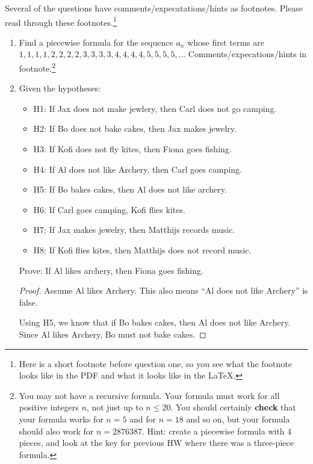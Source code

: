 \documentclass{article}
\begin{document}
\noindent Several of the questions have comments/expecatations/hints as footnotes. Please read through these footnotes.\footnote{Here is a short footnote before question one, so you see what the footnote looks like in the PDF and what it looks like in the LaTeX.}
\begin{enumerate}

\item Find a piecewise formula for the sequence $a_n$ whose first terms are\vskip1pt $1,1,1,1,2,2,2,2,3,3,3,3,4,4,4,4,5,5,5,5,\dots$\vskip1pt  Comments/expecations/hints in footnote.\footnote{You may not have a recursive formula. Your formula must work for all positive integers $n$, not just up to $n \leq 20$. You should certainly {\bf check} that your formula works for $n=5$ and for $n=18$ and so on, but your formula should also work for $n=2876387$. Hint: create a piecewise formula with $4$ pieces, and look at the key for previous HW where there was a three-piece formula.}

\newpage

\item Given the hypotheses:
\begin{itemize}
\item H1: If Jax does not make jewlery, then Carl does not go camping. 
\item H2: If Bo does not bake cakes, then Jax makes jewelry. 
\item H3: If Kofi does not fly kites, then Fiona goes fishing. 
\item H4: If Al does not like Archery, then Carl goes camping. 
\item H5: If Bo bakes cakes, then Al does not like archery. 
\item H6: If Carl goes camping, Kofi flies kites. 
\item H7: If Jax makes jewelry, then Matthijs records music. 
\item H8: If Kofi flies kites, then Matthijs does not record music. 
\end{itemize}
Prove: If Al likes archery, then Fiona goes fishing.

\begin{proof}
    Assume Al likes Archery. This also means ``Al does not like Archery'' is false.

    Using H5, we know that if Bo bakes cakes, then Al does not like Archery. Since Al likes Archery, Bo must not bake cakes.


\end{proof}
\end{enumerate}
\end{document}

